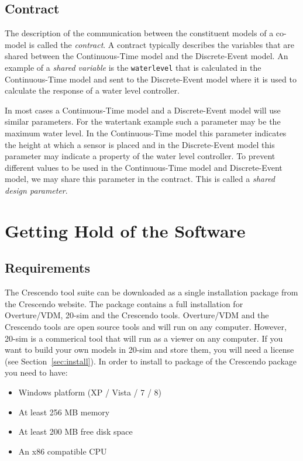 \documentclass{crescendorepchap}
\begin{document}
\section{Contract}

The description of the communication between the constituent models of a
co-model is called the \emph{contract}. A contract typically describes
the variables that are shared between the Continuous-Time model and the
Discrete-Event model. An example of a \emph{shared variable} is the
\texttt{waterlevel} that is calculated in the Continuous-Time model and sent to
the Discrete-Event model where it is used to calculate the response of a
water level controller.

In most cases a Continuous-Time model and a Discrete-Event model will
use similar parameters. For the watertank example such a parameter may
be the maximum water level. In the Continuous-Time model this parameter
indicates the height at which a sensor is placed and in the Discrete-Event
model this parameter may indicate a property of the water level
controller. To prevent different values to be used in the
Continuous-Time model and Discrete-Event model, we may share this
parameter in the contract. This is called a \emph{shared design
parameter}.

\chapter{Getting Hold of the Software}\label{chap:getting}

\section{Requirements}

The Crescendo tool suite can be downloaded as a single installation
package from the Crescendo website. The package contains a
full installation for Overture/VDM, 20-sim and the
Crescendo tools. Overture/VDM and the Crescendo tools are open source tools and
will run on any computer. However, 20-sim is a commerical tool that will run as a
viewer on any computer. If you want to build your own models in 20-sim
and store them, you will need a license (see Section~\ref{sec:install}). In order to install to package of the Crescendo package you need to have:

\begin{itemize}
\item
  Windows platform (XP / Vista / 7 / 8)
\item At least
  256 MB memory
\item At least
  200 MB free disk space
\item An
  x86 compatible CPU
\end{itemize}
\end{document}
